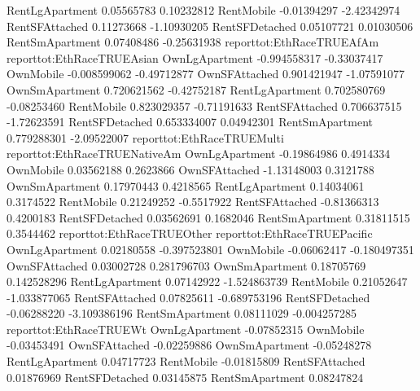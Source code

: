 \documentclass{article}
\begin{document}
\begin{Schunk}
\begin{Soutput}
RentLgApartment                  0.05565783                    0.10232812
RentMobile                      -0.01394297                   -2.42342974
RentSFAttached                   0.11273668                   -1.10930205
RentSFDetached                   0.05107721                    0.01030506
RentSmApartment                  0.07408486                   -0.25631938
                reporttot:EthRaceTRUEAfAm reporttot:EthRaceTRUEAsian
OwnLgApartment               -0.994558317                -0.33037417
OwnMobile                    -0.008599062                -0.49712877
OwnSFAttached                 0.901421947                -1.07591077
OwnSmApartment                0.720621562                -0.42752187
RentLgApartment               0.702580769                -0.08253460
RentMobile                    0.823029357                -0.71191633
RentSFAttached                0.706637515                -1.72623591
RentSFDetached                0.653334007                 0.04942301
RentSmApartment               0.779288301                -2.09522007
                reporttot:EthRaceTRUEMulti reporttot:EthRaceTRUENativeAm
OwnLgApartment                 -0.19864986                     0.4914334
OwnMobile                       0.03562188                     0.2623866
OwnSFAttached                  -1.13148003                     0.3121788
OwnSmApartment                  0.17970443                     0.4218565
RentLgApartment                 0.14034061                     0.3174522
RentMobile                      0.21249252                    -0.5517922
RentSFAttached                 -0.81366313                     0.4200183
RentSFDetached                  0.03562691                     0.1682046
RentSmApartment                 0.31811515                     0.3544462
                reporttot:EthRaceTRUEOther reporttot:EthRaceTRUEPacific
OwnLgApartment                  0.02180558                 -0.397523801
OwnMobile                      -0.06062417                 -0.180497351
OwnSFAttached                   0.03002728                  0.281796703
OwnSmApartment                  0.18705769                  0.142528296
RentLgApartment                 0.07142922                 -1.524863739
RentMobile                      0.21052647                 -1.033877065
RentSFAttached                  0.07825611                 -0.689753196
RentSFDetached                 -0.06288220                 -3.109386196
RentSmApartment                 0.08111029                 -0.004257285
                reporttot:EthRaceTRUEWt
OwnLgApartment              -0.07852315
OwnMobile                   -0.03453491
OwnSFAttached               -0.02259886
OwnSmApartment              -0.05248278
RentLgApartment              0.04717723
RentMobile                  -0.01815809
RentSFAttached               0.01876969
RentSFDetached               0.03145875
RentSmApartment              0.08247824


\end{Soutput}
\end{Schunk}
\end{document}
